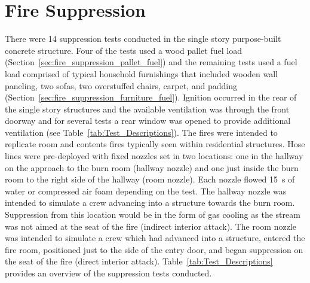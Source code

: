 \documentclass[12pt,oneside]{book}
\begin{document}
\section{Fire Suppression}
\label{sec:Fire_Suppression}
There were 14 suppression tests conducted in the single story purpose-built concrete structure. Four of the tests used a wood pallet fuel load (Section~\ref{sec:fire_suppression_pallet_fuel}) and the remaining tests used a fuel load comprised of typical household furnishings that included wooden wall paneling, two sofas, two overstuffed chairs, carpet, and padding (Section~\ref{sec:fire_suppression_furniture_fuel}). Ignition occurred in the rear of the single story structures and the available ventilation was through the front doorway and for several tests a rear window was opened to provide additional ventilation (see Table~\ref{tab:Test_Descriptions}). The fires were intended to replicate room and contents fires typically seen within residential structures. Hose lines were pre-deployed with fixed nozzles set in two locations: one in the hallway on the approach to the burn room (hallway nozzle) and one just inside the burn room to the right side of the hallway (room nozzle). Each nozzle flowed 15~s of water or compressed air foam depending on the test. The hallway nozzle was intended to simulate a crew advancing into a structure towards the burn room. Suppression from this location would be in the form of gas cooling as the stream was not aimed at the seat of the fire (indirect interior attack). The room nozzle was intended to simulate a crew which had advanced into a structure, entered the fire room, positioned just to the side of the entry door, and began suppression on the seat of the fire (direct interior attack). Table~\ref{tab:Test_Descriptions} provides an overview of the suppression tests conducted.
\end{document}
